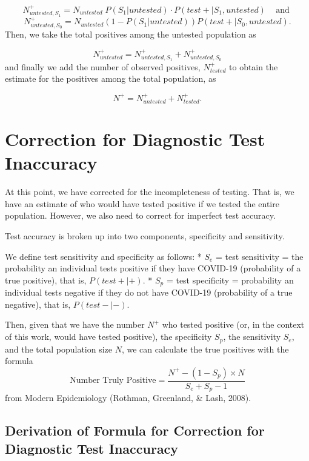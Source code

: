 \documentclass[12pt,twoside]{smiththesis}
\begin{document}
\[N^+_{untested,S_1} = N_{untested} \; P(S_1|untested) \cdot P(test + | S_1,untested) \;\;\;\text{ and }\]
\[N^+_{untested,S_0} = N_{untested}(1-P(S_1|untested))P(test + | S_0,untested).\]
Then, we take the total positives among the untested population as

\[N^+_{untested} = N^+_{untested,S_1} + N^+_{untested,S_0}\]
and finally we add the number of observed positives, \(N^+_{tested}\) to obtain the estimate for the positives among the total population, as

\[N^+ = N^+_{untested} +N^+_{tested}.\]

\hypertarget{correction-for-diagnostic-test-inaccuracy}{%
\section{Correction for Diagnostic Test Inaccuracy}\label{correction-for-diagnostic-test-inaccuracy}}

At this point, we have corrected for the incompleteness of testing. That is, we have an estimate of who would have tested positive if we tested the entire population. However, we also need to correct for imperfect test accuracy.

Test accuracy is broken up into two components, specificity and sensitivity.

We define test sensitivity and specificity as follows:
* \(S_e\) = test sensitivity = the probability an individual tests positive if they have COVID-19 (probability of a true positive), that is, \(P(test + | +)\).
* \(S_p\) = test specificity = probability an individual tests negative if they do not have COVID-19 (probability of a true negative), that is, \(P(test - |-)\).

Then, given that we have the number \(N^+\) who tested positive (or, in the context of this work, would have tested positive), the specificity \(S_p\), the sensitivity \(S_e\), and the total population size \(N\), we can calculate the true positives with the formula
\[\text{Number Truly Positive} = \dfrac{N^+ - (1-S_p) \times N}{S_e+S_p-1}\]
from Modern Epidemiology (Rothman, Greenland, \& Lash, 2008).

\hypertarget{derivation-of-formula-for-correction-for-diagnostic-test-inaccuracy}{%
\subsection{Derivation of Formula for Correction for Diagnostic Test Inaccuracy}\label{derivation-of-formula-for-correction-for-diagnostic-test-inaccuracy}}
\end{document}
